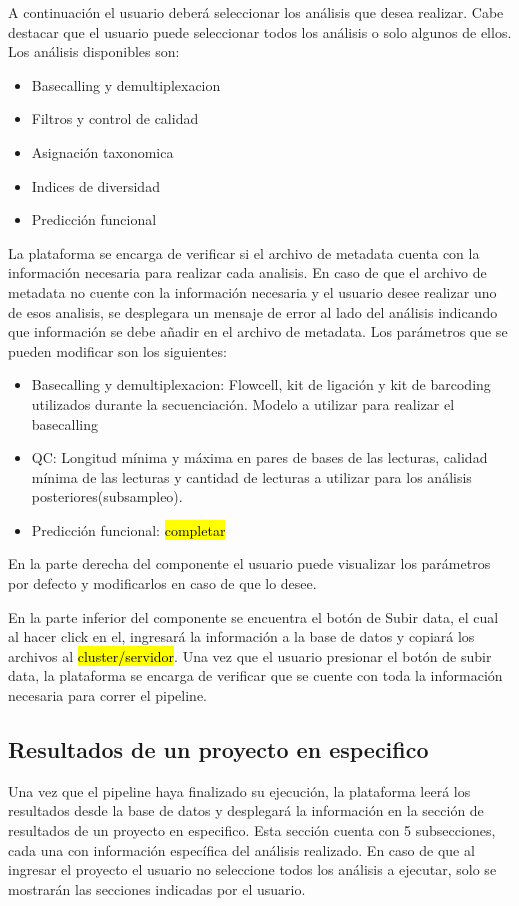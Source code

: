 A continuación el usuario deberá seleccionar los análisis que desea realizar. Cabe destacar que el usuario puede seleccionar todos los análisis o solo algunos de ellos. Los análisis disponibles son:
\begin{itemize}
    \item Basecalling y demultiplexacion
    \item Filtros y control de calidad
    \item Asignación taxonomica
    \item Indices de diversidad
    \item Predicción funcional
\end{itemize}

La plataforma se encarga de verificar si el archivo de metadata cuenta con la información necesaria para realizar cada analisis. En caso de que el archivo de metadata no cuente con la información necesaria y el usuario desee realizar uno de esos analisis, se desplegara un mensaje de error al lado del análisis indicando que información se debe añadir en el archivo de metadata. Los parámetros que se pueden modificar son los siguientes:
\begin{itemize}
    \item Basecalling y demultiplexacion: Flowcell, kit de ligación y kit de barcoding utilizados durante la secuenciación. Modelo a utilizar para realizar el basecalling
    \item QC: Longitud mínima y máxima en pares de bases de las lecturas, calidad mínima de las lecturas y cantidad de lecturas a utilizar para los análisis posteriores(subsampleo).
    \item Predicción funcional: \hl{completar}
\end{itemize}

En la parte derecha del componente el usuario puede visualizar los parámetros por defecto y modificarlos en caso de que lo desee. 


En la parte inferior del componente se encuentra el botón de Subir data, el cual al hacer click en el, ingresará la información a la base de datos y copiará los archivos al \hl{cluster/servidor}. Una vez que el usuario presionar el botón de subir data, la plataforma se encarga de verificar que se cuente con toda la información necesaria para correr el pipeline.
\subsection{Resultados de un proyecto en especifico}
Una vez que el pipeline haya finalizado su ejecución, la plataforma leerá los resultados desde la base de datos y desplegará la información en la sección de resultados de un proyecto en especifico. Esta sección cuenta con 5 subsecciones, cada una con información específica del análisis realizado. En caso de que al ingresar el proyecto el usuario no seleccione todos los análisis a ejecutar, solo se mostrarán las secciones indicadas por el usuario.

